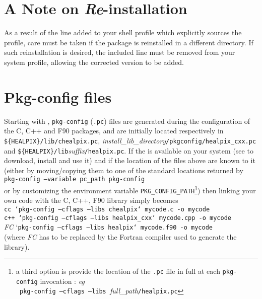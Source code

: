 \documentclass[12pt,twoside]{article}
\begin{document}


\section{A Note on {\it Re}-installation}

As a result of the line added to your shell profile which explicitly
sources the \healpix profile, care must be taken if the package 
is reinstalled in a different directory. If such reinstallation
is desired, the included line must be removed from your system profile,
allowing the corrected version to be added.  

\section{Pkg-config files}
\label{sec:pkg-config}
Starting with , {\tt pkg-config} ({\tt .pc}) files are generated
during the configuration of the 
C, C++ and F90 packages, and are initially located respectively in
{\tt \$\{HEALPIX\}/lib/chealpix.pc},
{\em install\_lib\_directory}{\tt /pkgconfig/healpix\_cxx.pc}
and 
{\tt \$\{HEALPIX\}/lib}{\em suffix}{\tt /healpix.pc}.
If the 
is available on your system (see 
 to download, install and
use it) and if the location of
the  files above are known to it (either by moving/copying them
to one of the standard locations returned by \\
{\tt pkg-config --variable pc\_path pkg-config}\\
or by customizing the environment variable {\tt PKG\_CONFIG\_PATH}\footnote{a
third option is provide the location of the {\tt .pc} file in full at each
{\tt pkg-config} invocation : {\it eg}\\ {\tt
pkg-config --cflags --libs }{\em full\_path}{\tt /healpix.pc}}) then linking
your own code with the 
C,
C++,
F90 \healpix library simply becomes \\
{\tt cc `pkg-config --cflags --libs chealpix` mycode.c -o mycode} \\
{\tt c++ `pkg-config --cflags --libs healpix\_cxx` mycode.cpp -o mycode} \\
{\em FC} `{\tt pkg-config --cflags --libs healpix` mycode.f90 -o mycode}\\
(where {\em FC} has to be replaced by the Fortran compiler used to generate the
\healpix library).
\end{document}
